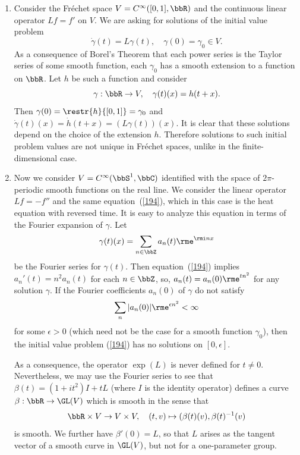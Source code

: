 \begin{rem}
    \begin{enumerate}[label=(\alph*)]
        \item Consider the Fr\'echet space $V=C^\infty([0,1],\bbR)$ and the continuous linear operator $Lf=f'$ on $V$. We are asking for solutions of the initial value problem
        \[\dot\gamma(t)=L\gamma(t), \quad \gamma(0)=\gamma_0\in V.\label{194}\]
        As a consequence of Borel's Theorem that each power series is the Taylor series of some smooth function, each $\gamma_0$ has a smooth extension to a function on $\bbR$. Let $h$ be such a function and consider
        \[\gamma:\bbR\to V, \quad \gamma(t)(x)=h(t+x).\]
        Then $\gamma(0)=\restr{h}{[0,1]}=\gamma_0$ and $\dot\gamma(t)(x)=\dot h(t+x)=(L\gamma(t))(x)$. It is clear that these solutions depend on the choice of the extension $h$. Therefore solutions to such initial problem values are not unique in Fr\'echet spaces, unlike in the finite-dimensional case.
        
        \item Now we consider $V=C^\infty(\bbS^1,\bbC)$ identified with the space of $2\pi$-periodic smooth functions on the real line. We consider the linear operator $Lf=-f''$ and the same equation~(\ref{194}), which in this case is the heat equation with reversed time. It is easy to analyze this equation in terms of the Fourier expansion of $\gamma$. Let
        \[\gamma(t)(x)=\sum_{n\in \bbZ} a_n(t)\rme^{\rmi nx}\]
        be the Fourier series for $\gamma(t)$. Then equation~(\ref{194}) implies $a_n'(t)=n^2a_n(t)$ for each $n\in\bbZ$, so, $a_n(t)=a_n(0)\rme^{tn^2}$ for any solution $\gamma$. If the Fourier coefficients $a_n(0)$ of $\gamma$ do not satisfy
        \[\sum_n |a_n(0)|\rme^{\epsilon n^2}<\infty\]
        for some $\epsilon>0$ (which need not be the case for a smooth function $\gamma_0$), then the initial value problem (\ref{194}) has no solutions on $[0,\epsilon]$.

        As a consequence, the operator $\exp(L)$ is never defined for $t\neq 0$. Nevertheless, we may use the Fourier series to see that $\beta(t)=(1+it^2)I+tL$ (where $I$ is the identity operator) defines a curve $\beta:\bbR\to \GL(V)$ which is smooth in the sense that 
        \[\bbR\times V\to V\times V,\quad (t,v)\mapsto (\beta(t)(v),\beta(t)^{-1}(v)\]
        is smooth. We further have $\beta'(0)=L$, so that $L$ arises as the tangent vector of a smooth curve in $\GL(V)$, but not for a one-parameter group.
    \end{enumerate}
\end{rem}

